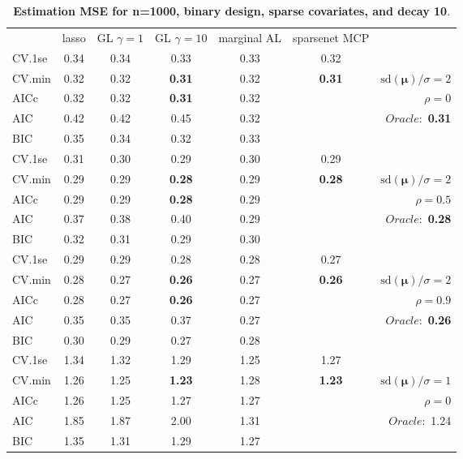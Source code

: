 \begin{table}\vspace{-.5cm}
\caption[l]{ { \bf Estimation MSE for n=1000, binary design, 
sparse covariates, and  decay  10}.}
\vspace{-.5cm}
\footnotesize{}
\begin{center}
\begin{tabular}{l*{5}{c}|r}
& lasso & GL $\gamma=1$ & GL $\gamma=10$ & marginal AL & sparsenet MCP  & \\
 \cline{1-7}
CV.1se & 0.34 & 0.34 & 0.33 & 0.33 & 0.32 & \\
CV.min & 0.32 & 0.32 & {\bf 0.31} & 0.32 & {\bf 0.31} &  $\mathrm{sd}(\mathbf{\mu})/\sigma=2$ \\
AICc & 0.32 & 0.32 & {\bf 0.31} & 0.32 & & $\rho=0$ \\
AIC & 0.42 & 0.42 & 0.45 & 0.32 & &  \multirow{2}{*}{$Oracle: $ {\bf 0.31}} \\
BIC & 0.35 & 0.34 & 0.32 & 0.33 & &  \\
 \hline 
CV.1se & 0.31 & 0.30 & 0.29 & 0.30 & 0.29 & \\
CV.min & 0.29 & 0.29 & {\bf 0.28} & 0.29 & {\bf 0.28} &  $\mathrm{sd}(\mathbf{\mu})/\sigma=2$ \\
AICc & 0.29 & 0.29 & {\bf 0.28} & 0.29 & & $\rho=0.5$ \\
AIC & 0.37 & 0.38 & 0.40 & 0.29 & &  \multirow{2}{*}{$Oracle: $ {\bf 0.28}} \\
BIC & 0.32 & 0.31 & 0.29 & 0.30 & &  \\
 \hline 
CV.1se & 0.29 & 0.29 & 0.28 & 0.28 & 0.27 & \\
CV.min & 0.28 & 0.27 & {\bf 0.26} & 0.27 & {\bf 0.26} &  $\mathrm{sd}(\mathbf{\mu})/\sigma=2$ \\
AICc & 0.28 & 0.27 & {\bf 0.26} & 0.27 & & $\rho=0.9$ \\
AIC & 0.35 & 0.35 & 0.37 & 0.27 & &  \multirow{2}{*}{$Oracle: $ {\bf 0.26}} \\
BIC & 0.30 & 0.29 & 0.27 & 0.28 & &  \\
 \hline 
CV.1se & 1.34 & 1.32 & 1.29 & 1.25 & 1.27 & \\
CV.min & 1.26 & 1.25 & {\bf 1.23} & 1.28 & {\bf 1.23} &  $\mathrm{sd}(\mathbf{\mu})/\sigma=1$ \\
AICc & 1.26 & 1.25 & 1.27 & 1.27 & & $\rho=0$ \\
AIC & 1.85 & 1.87 & 2.00 & 1.31 & &  \multirow{2}{*}{$Oracle: $ 1.24} \\
BIC & 1.35 & 1.31 & 1.29 & 1.27 & &  \\

\end{tabular}
\end{center}
\end{table}

